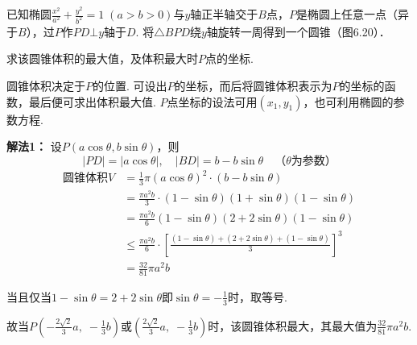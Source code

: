 \begin{example}
已知椭圆$\frac{x^2}{a^2}+\frac{y^2}{b^2}=1\; (a>b>0)$与$y$轴正半轴交于$B$点，$P$是椭圆上任意一点（异于$B$），过$P$作$PD\bot y$轴于$D$. 将$\triangle BPD$绕$y$轴旋转一周得到一个圆锥（图6.20）．

求该圆锥体积的最大值，及体积最大时$P$点的坐标.
\end{example}

\begin{analyze}
    圆锥体积决定于$P$的位置. 可设出$P$的坐标，而后将圆锥体积表示为$P$的坐标的函数，最后便可求出体积最大值. $P$点坐标的设法可用$(x_1,y_1)$，也可利用椭圆的参数方程.
\end{analyze}

\begin{solution}
    \textbf{解法1：}
设$P(a\cos\theta,b\sin\theta)$，则
\[|PD|=|a\cos\theta|,\quad |BD|=b-b\sin\theta\quad \text{（$\theta$为参数）}\]
\[\begin{split}
    \text{圆锥体积}V&=\frac{1}{3}\pi (a\cos\theta)^2\cdot (b-b\sin\theta)\\
    &=\frac{\pi a^2 b}{3}\cdot (1-\sin\theta)(1+\sin\theta)(1-\sin\theta)\\
    &=\frac{\pi a^2b}{6}(1-\sin\theta)(2+2\sin\theta)(1-\sin\theta)\\
    &\le \frac{\pi a^2b}{6}\cdot \left[\frac{(1-\sin\theta)+(2+2\sin\theta)+(1-\sin\theta)}{3}\right]^3\\
    &=\frac{32}{81}\pi a^2b
\end{split}\]

当且仅当$1-\sin\theta=2+2\sin\theta$即$\sin\theta=-\frac{1}{3}$时，取等号.

故当$P\left(-\frac{2\sqrt{2}}{3}a,\; -\frac{1}{3}b\right)$或$\left(\frac{2\sqrt{2}}{3}a,\; -\frac{1}{3}b\right)$时，该圆锥体积最大，其最大值为$\frac{32}{81}\pi a^2b$.



\end{solution}
